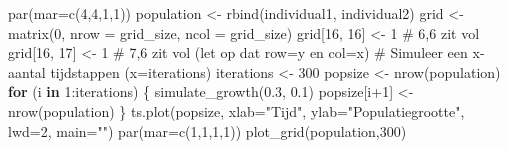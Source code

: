 \documentclass[
  a4paper,
]{scrbook}
\newenvironment{Shaded}{\begin{snugshade}}{\end{snugshade}}
\newcommand{\AttributeTok}[1]{\textcolor[rgb]{0.40,0.45,0.13}{#1}}
\newcommand{\CommentTok}[1]{\textcolor[rgb]{0.37,0.37,0.37}{#1}}
\newcommand{\ControlFlowTok}[1]{\textcolor[rgb]{0.00,0.23,0.31}{\textbf{#1}}}
\newcommand{\DecValTok}[1]{\textcolor[rgb]{0.68,0.00,0.00}{#1}}
\newcommand{\FloatTok}[1]{\textcolor[rgb]{0.68,0.00,0.00}{#1}}
\newcommand{\FunctionTok}[1]{\textcolor[rgb]{0.28,0.35,0.67}{#1}}
\newcommand{\NormalTok}[1]{\textcolor[rgb]{0.00,0.23,0.31}{#1}}
\newcommand{\OtherTok}[1]{\textcolor[rgb]{0.00,0.23,0.31}{#1}}
\newcommand{\SpecialCharTok}[1]{\textcolor[rgb]{0.37,0.37,0.37}{#1}}
\newcommand{\StringTok}[1]{\textcolor[rgb]{0.13,0.47,0.30}{#1}}
\theoremstyle{definition}
\theoremstyle{remark}
\begin{document}
\begin{Shaded}
\begin{Highlighting}[]
\FunctionTok{par}\NormalTok{(}\AttributeTok{mar=}\FunctionTok{c}\NormalTok{(}\DecValTok{4}\NormalTok{,}\DecValTok{4}\NormalTok{,}\DecValTok{1}\NormalTok{,}\DecValTok{1}\NormalTok{))}
\NormalTok{population }\OtherTok{\textless{}{-}} \FunctionTok{rbind}\NormalTok{(individual1, individual2)}
\NormalTok{grid }\OtherTok{\textless{}{-}} \FunctionTok{matrix}\NormalTok{(}\DecValTok{0}\NormalTok{, }\AttributeTok{nrow =}\NormalTok{ grid\_size, }\AttributeTok{ncol =}\NormalTok{ grid\_size)}
\NormalTok{grid[}\DecValTok{16}\NormalTok{, }\DecValTok{16}\NormalTok{] }\OtherTok{\textless{}{-}} \DecValTok{1} \CommentTok{\# 6,6 zit vol}
\NormalTok{grid[}\DecValTok{16}\NormalTok{, }\DecValTok{17}\NormalTok{] }\OtherTok{\textless{}{-}} \DecValTok{1} \CommentTok{\# 7,6 zit vol (let op dat row=y en col=x)}
\CommentTok{\# Simuleer een x{-}aantal tijdstappen (x=iterations)}
\NormalTok{iterations }\OtherTok{\textless{}{-}} \DecValTok{300}
\NormalTok{popsize }\OtherTok{\textless{}{-}} \FunctionTok{nrow}\NormalTok{(population)}
\ControlFlowTok{for}\NormalTok{ (i }\ControlFlowTok{in} \DecValTok{1}\SpecialCharTok{:}\NormalTok{iterations) \{}
  \FunctionTok{simulate\_growth}\NormalTok{(}\FloatTok{0.3}\NormalTok{, }\FloatTok{0.1}\NormalTok{)}
\NormalTok{  popsize[i}\SpecialCharTok{+}\DecValTok{1}\NormalTok{] }\OtherTok{\textless{}{-}} \FunctionTok{nrow}\NormalTok{(population)}
\NormalTok{\}}
\FunctionTok{ts.plot}\NormalTok{(popsize, }\AttributeTok{xlab=}\StringTok{"Tijd"}\NormalTok{, }\AttributeTok{ylab=}\StringTok{"Populatiegrootte"}\NormalTok{, }\AttributeTok{lwd=}\DecValTok{2}\NormalTok{, }\AttributeTok{main=}\StringTok{""}\NormalTok{)}
\FunctionTok{par}\NormalTok{(}\AttributeTok{mar=}\FunctionTok{c}\NormalTok{(}\DecValTok{1}\NormalTok{,}\DecValTok{1}\NormalTok{,}\DecValTok{1}\NormalTok{,}\DecValTok{1}\NormalTok{))}
\FunctionTok{plot\_grid}\NormalTok{(population,}\DecValTok{300}\NormalTok{)}


\end{Highlighting}
\end{Shaded}
\end{document}
